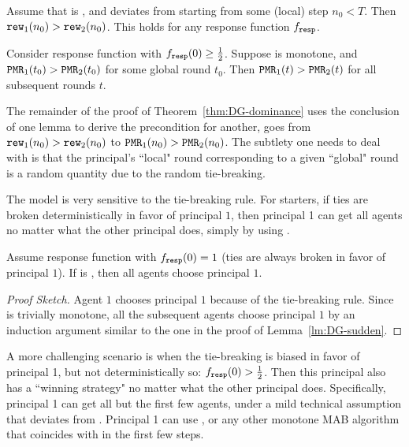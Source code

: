 \begin{lemma}\label{lm:DG-rew}
Assume that \alg[1] is \DynGreedy, and \alg[2] deviates from \DynGreedy starting from some (local) step $n_0<T$. Then $\mathtt{rew}_1(n_0)>\mathtt{rew}_2(n_0)$. This holds for any response function $f_{\mathtt{resp}}$.
\end{lemma}


\begin{lemma}\label{lm:DG-sudden}
Consider \HardMax response function with $f_{\mathtt{resp}}(0)\geq\tfrac12$.
Suppose \alg[1] is monotone, and $\mathtt{PMR}_1(t_0)>\mathtt{PMR}_2(t_0)$ for some global round $t_0$. Then $\mathtt{PMR}_1(t)>\mathtt{PMR}_2(t)$ for all subsequent rounds $t$.
\end{lemma}

The remainder of the proof of Theorem~\ref{thm:DG-dominance} uses the conclusion of one lemma to derive the precondition for another, \ie goes from $\mathtt{rew}_1(n_0)>\mathtt{rew}_2(n_0)$ to $\mathtt{PMR}_1(n_0)>\mathtt{PMR}_2(n_0)$. The subtlety one needs to deal with is that the principal's ``local" round corresponding to a given ``global" round is a random quantity due to the random tie-breaking.


The \HardMax model is very sensitive to the tie-breaking rule. For starters, if ties are  broken deterministically in favor of principal $1$, then principal 1 can get all agents no matter what the other principal does, simply by using \StaticGreedy.

\begin{theorem}\label{thm:HardMax-hardTies}
Assume \HardMax response function with $f_{\mathtt{resp}}(0)=1$ (ties are always broken in favor of principal $1$). If \alg[1] is \StaticGreedy, then all agents choose principal $1$.
\end{theorem}

\begin{proof}[Proof Sketch]
Agent $1$ chooses principal $1$ because of the tie-breaking rule. Since \StaticGreedy is trivially monotone, all the subsequent agents choose principal $1$ by an induction argument similar to the one in the proof of Lemma~\ref{lm:DG-sudden}.
\end{proof}



A more challenging scenario is when the tie-breaking is biased in favor of principal 1, but not deterministically so: $f_{\mathtt{resp}}(0)>\tfrac12$. Then this principal also has a ``winning strategy" no matter what the other principal does. Specifically, principal 1 can get all but the first few agents, under a mild technical assumption that \DynGreedy deviates from \StaticGreedy. Principal 1 can use \DynGreedy, or any other monotone MAB algorithm that coincides with \DynGreedy in the first few steps.

